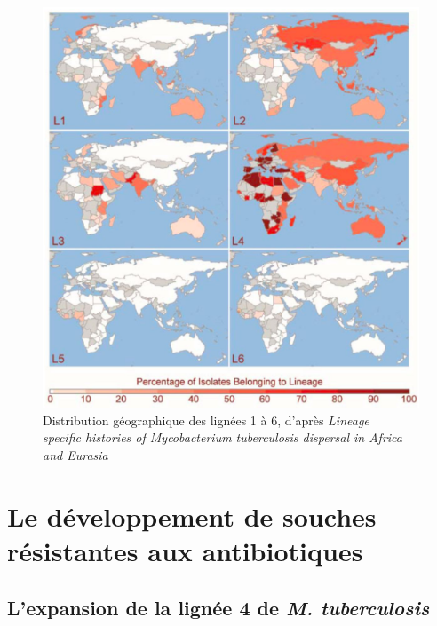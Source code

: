 \documentclass[twoside,a4paper,11pt,frenchb,openany]{report}
\begin{document}
\begin{figure}
\centering
\includegraphics[scale=0.5]{world.png}
\caption{Distribution géographique des lignées 1 à 6, d'après \textit{Lineage\\ specific histories of Mycobacterium tuberculosis dispersal in Africa and Eurasia}}
\end{figure}


\section{Le développement de souches résistantes aux antibiotiques}

\subsection{L'expansion de la lignée 4 de \textit{M. tuberculosis}}

\end{document}

